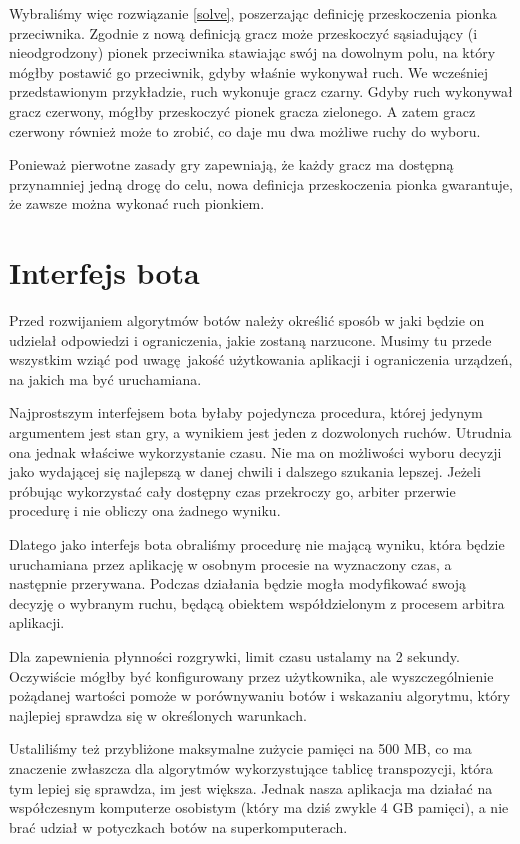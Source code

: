 \documentclass{pracamgr}
\begin{document}
Wybraliśmy więc rozwiązanie \ref{solve}, poszerzając definicję przeskoczenia pionka przeciwnika.
Zgodnie z nową definicją gracz może przeskoczyć sąsiadujący (i nieodgrodzony) pionek przeciwnika stawiając swój  na dowolnym polu, na który mógłby postawić go przeciwnik, gdyby właśnie wykonywał ruch.
We wcześniej przedstawionym przykładzie, ruch wykonuje gracz czarny.
Gdyby ruch wykonywał gracz czerwony, mógłby przeskoczyć pionek gracza zielonego.
A zatem gracz czerwony również może to zrobić, co daje mu dwa możliwe ruchy do wyboru.

Ponieważ pierwotne zasady gry zapewniają, że każdy gracz ma dostępną przynamniej jedną drogę do celu, nowa definicja przeskoczenia pionka gwarantuje, że zawsze można wykonać ruch pionkiem.

\section{Interfejs bota}

Przed rozwijaniem algorytmów botów należy określić sposób w jaki będzie on udzielał odpowiedzi i ograniczenia, jakie zostaną narzucone.
Musimy tu przede wszystkim wziąć pod uwagę jakość użytkowania aplikacji i ograniczenia urządzeń, na jakich ma być uruchamiana.

Najprostszym interfejsem bota byłaby pojedyncza procedura, której jedynym argumentem jest stan gry, a wynikiem jest jeden z dozwolonych ruchów.
Utrudnia ona jednak właściwe wykorzystanie czasu.
Nie ma on możliwości wyboru decyzji jako wydającej się najlepszą w danej chwili i dalszego szukania lepszej.
Jeżeli próbując wykorzystać cały dostępny czas przekroczy go, arbiter przerwie procedurę i nie obliczy ona żadnego wyniku.

Dlatego jako interfejs bota obraliśmy procedurę nie mającą wyniku, która będzie uruchamiana przez aplikację w osobnym procesie na wyznaczony czas, a następnie przerywana.
Podczas działania będzie mogła modyfikować swoją decyzję o wybranym ruchu, będącą obiektem współdzielonym z procesem arbitra aplikacji.

Dla zapewnienia płynności rozgrywki, limit czasu ustalamy na 2 sekundy.
Oczywiście mógłby być konfigurowany przez użytkownika, ale wyszczególnienie pożądanej wartości pomoże w porównywaniu botów i wskazaniu algorytmu, który najlepiej sprawdza się w określonych warunkach.

Ustaliliśmy też przybliżone maksymalne zużycie pamięci na 500 MB, co ma znaczenie zwłaszcza dla algorytmów wykorzystujące tablicę transpozycji, która tym lepiej się sprawdza, im jest większa.
Jednak nasza aplikacja ma działać na współczesnym komputerze osobistym (który ma dziś zwykle 4 GB pamięci), a nie brać udział w potyczkach botów na superkomputerach.
\end{document}
